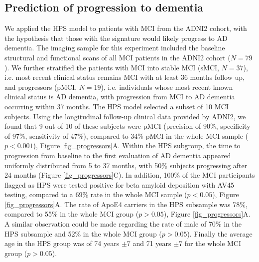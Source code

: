 \documentclass[authoryear]{elsarticle}
\begin{document}
\subsection*{Prediction of progression to dementia}
We applied the HPS model to patients with MCI from the ADNI2 cohort, with the hypothesis that those with the signature would likely progress to AD dementia. The imaging sample for this experiment included the baseline structural and functional scans of all MCI patients in the ADNI2 cohort ($N=79$). We further stratified the patients with MCI into stable MCI (sMCI, $N=37$), i.e. most recent clinical status remains MCI with at least 36 months follow up, and progressors (pMCI, $N=19$), i.e. individuals whose most recent known clinical status is AD dementia, with progression from MCI to AD dementia occurring within 37 months. The HPS model selected a subset of 10 MCI subjects. Using the longitudinal follow-up clinical data provided by ADNI2, we found that 9 out of 10 of these subjects were pMCI (precision of 90\%, specificity of 97\%, sensitivity of 47\%), compared to 34\% pMCI in the whole MCI sample ($p<0.001$), Figure \ref{fig_progressors}A. Within the HPS subgroup, the time to progression from baseline to the first evaluation of AD dementia appeared uniformly distributed from 5 to 37 months, with 50\% subjects progressing after 24 months (Figure \ref{fig_progressors}C). In addition, 100\% of the MCI participants flagged as HPS were tested positive for beta amyloid deposition with AV45 testing, compared to a 69\% rate in the whole MCI sample ($p<0.05$), Figure \ref{fig_progressors}A. The rate of ApoE4 carriers in the HPS subsample was 78\%, compared to 55\% in the whole MCI group ($p>0.05$), Figure \ref{fig_progressors}A. A similar observation could be made regarding the rate of male of 70\% in the HPS subsample and 52\% in the whole MCI group ($p>0.05$). Finally the average age in the HPS group was of 74 years $\pm7$ and 71 years $\pm7$ for the whole MCI group ($p>0.05$).
\end{document}

